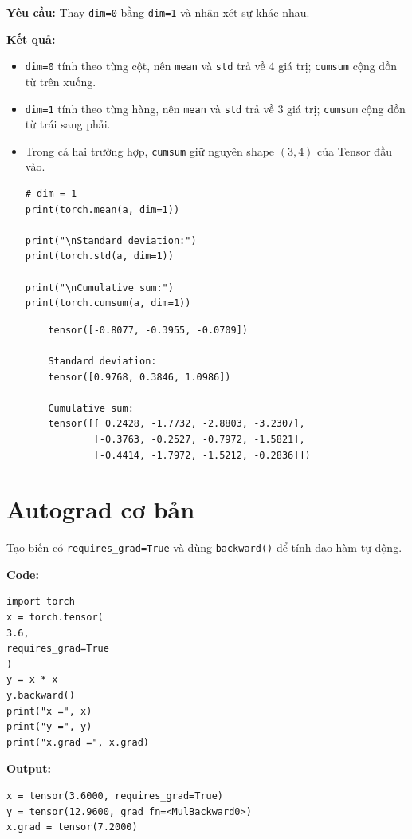\documentclass[12pt,a4paper]{article}
\begin{document}
\textbf{Yêu cầu:}
Thay \texttt{dim=0} bằng \texttt{dim=1} và nhận xét sự khác nhau.

\textbf{Kết quả:}
\begin{itemize}
    \item \texttt{dim=0} tính theo từng cột, nên \texttt{mean} và \texttt{std} trả về 4 giá trị; \texttt{cumsum} cộng dồn từ trên xuống.
    \item \texttt{dim=1} tính theo từng hàng, nên \texttt{mean} và \texttt{std} trả về 3 giá trị; \texttt{cumsum} cộng dồn từ trái sang phải.
    \item Trong cả hai trường hợp, \texttt{cumsum} giữ nguyên shape $(3,4)$ của Tensor đầu vào.

    \begin{verbatim}
# dim = 1
print(torch.mean(a, dim=1))

print("\nStandard deviation:")
print(torch.std(a, dim=1))

print("\nCumulative sum:")
print(torch.cumsum(a, dim=1))
\end{verbatim}

    \begin{verbatim}
    tensor([-0.8077, -0.3955, -0.0709])

    Standard deviation:
    tensor([0.9768, 0.3846, 1.0986])

    Cumulative sum:
    tensor([[ 0.2428, -1.7732, -2.8803, -3.2307],
            [-0.3763, -0.2527, -0.7972, -1.5821],
            [-0.4414, -1.7972, -1.5212, -0.2836]])
    \end{verbatim}
\end{itemize}



\section{Autograd cơ bản}
Tạo biến có \texttt{requires\_grad=True} và dùng \texttt{backward()} để tính đạo hàm tự động.

\textbf{Code:}
\begin{verbatim}
import torch
x = torch.tensor(
3.6,
requires_grad=True
)
y = x * x
y.backward()
print("x =", x)
print("y =", y)
print("x.grad =", x.grad)
\end{verbatim}

\textbf{Output:}
\begin{verbatim}
x = tensor(3.6000, requires_grad=True)
y = tensor(12.9600, grad_fn=<MulBackward0>)
x.grad = tensor(7.2000)
\end{verbatim}
\end{document}
